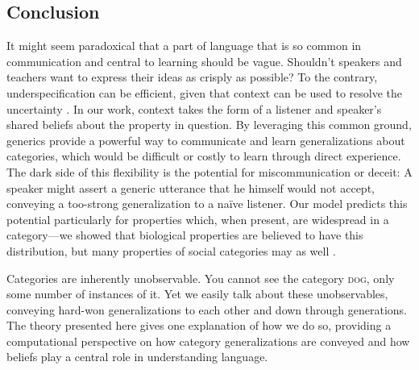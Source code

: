 \documentclass[12pt,letterpaper]{article}
\begin{document}


\subsection*{Conclusion}

It might seem paradoxical that a part of language that is so common in communication and central to learning should be vague. 
Shouldn't speakers and teachers want to express their ideas as crisply as possible?
To the contrary, underspecification can be efficient, given that context can be used to resolve the uncertainty \cite{Piantadosi2012}.
In our work, context takes the form of a listener and speaker's shared beliefs about the property in question. 
By leveraging this common ground, generics provide a powerful way to communicate and learn generalizations about categories, 
which would be difficult or costly to learn through direct experience.
The dark side of this flexibility is the potential for miscommunication or deceit: A speaker might assert a generic utterance that he himself would not accept, conveying a too-strong generalization to a na\"{i}ve listener.  
Our model predicts this potential particularly for properties which, when present, are widespread in a category---we showed that biological properties are believed to have this distribution, but many properties of social categories may as well \cite{Cimpian2011a,Cimpian2012b,Rhodes2012}.


Categories are inherently unobservable. 
You cannot see the category \textsc{dog}, only some number of instances of it.
Yet we easily talk about these unobservables, conveying hard-won generalizations to each other and down through generations.
The theory presented here gives one explanation of how we do so, providing a computational perspective on how category generalizations are conveyed and how beliefs play a central role in understanding language.
\end{document}
